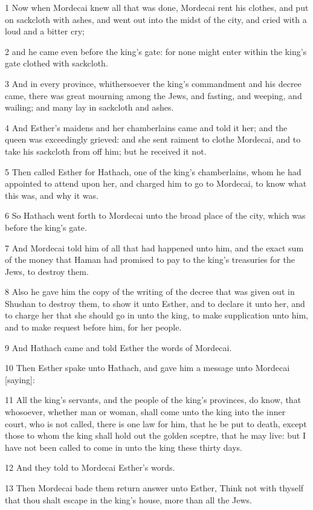 \par 1 Now when Mordecai knew all that was done, Mordecai rent his clothes, and put on sackcloth with ashes, and went out into the midst of the city, and cried with a loud and a bitter cry;
\par 2 and he came even before the king's gate: for none might enter within the king's gate clothed with sackcloth.
\par 3 And in every province, whithersoever the king's commandment and his decree came, there was great mourning among the Jews, and fasting, and weeping, and wailing; and many lay in sackcloth and ashes.
\par 4 And Esther's maidens and her chamberlains came and told it her; and the queen was exceedingly grieved: and she sent raiment to clothe Mordecai, and to take his sackcloth from off him; but he received it not.
\par 5 Then called Esther for Hathach, one of the king's chamberlains, whom he had appointed to attend upon her, and charged him to go to Mordecai, to know what this was, and why it was.
\par 6 So Hathach went forth to Mordecai unto the broad place of the city, which was before the king's gate.
\par 7 And Mordecai told him of all that had happened unto him, and the exact sum of the money that Haman had promised to pay to the king's treasuries for the Jews, to destroy them.
\par 8 Also he gave him the copy of the writing of the decree that was given out in Shushan to destroy them, to show it unto Esther, and to declare it unto her, and to charge her that she should go in unto the king, to make supplication unto him, and to make request before him, for her people.
\par 9 And Hathach came and told Esther the words of Mordecai.
\par 10 Then Esther spake unto Hathach, and gave him a message unto Mordecai [saying]:
\par 11 All the king's servants, and the people of the king's provinces, do know, that whosoever, whether man or woman, shall come unto the king into the inner court, who is not called, there is one law for him, that he be put to death, except those to whom the king shall hold out the golden sceptre, that he may live: but I have not been called to come in unto the king these thirty days.
\par 12 And they told to Mordecai Esther's words.
\par 13 Then Mordecai bade them return answer unto Esther, Think not with thyself that thou shalt escape in the king's house, more than all the Jews.
